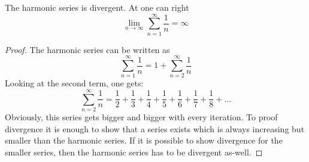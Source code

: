 \begin{theorem}
    The harmonic series is divergent. At one can right
    \begin{equation}
        \lim_{n\to\infty}\sum_{n=1}^{\infty}\frac{1}{n} = \infty
    \end{equation}
\end{theorem}
\begin{proof}
    The harmonic series can be written as
    \begin{equation}
        \sum_{n=1}^{\infty}\frac{1}{n} = 1 + \sum_{n=2}^{\infty}\frac{1}{n}
    \end{equation}
    Looking at the second term, one gets:
    \begin{equation}
        \sum_{n=2}^{\infty}\frac{1}{n} = 
            \frac{1}{2} + 
            \frac{1}{3} + \frac{1}{4} + 
            \frac{1}{5} + \frac{1}{6} + \frac{1}{7} + \frac{1}{8} + ...
    \end{equation}
    Obviously, this series gets bigger and bigger with every iteration.
    To proof divergence it is enough to show that a series exists which is always increasing 
    but smaller than the harmonic series.
    If it is possible to show divergence for the smaller series,
    then the harmonic series has to be divergent as-well.


\end{proof}
